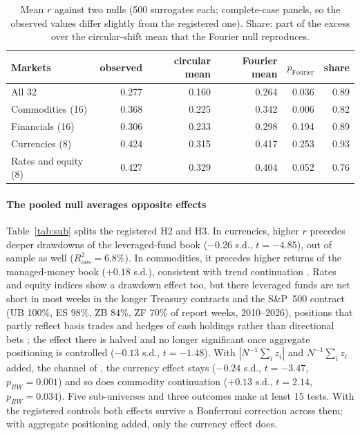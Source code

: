\documentclass[preprint,12pt,authoryear]{elsarticle}
\begin{document}
\begin{table}[t]
\centering
\caption{Mean $r$ against two nulls (500 surrogates each; complete-case
panels, so the observed values differ slightly from the registered one).
Share: part of the excess over the circular-shift mean that the
Fourier null reproduces.}
\label{tab:ft}
\small\setlength{\tabcolsep}{4pt}
\begin{tabular}{lrrrrr}
\toprule
Markets & observed & circular mean & Fourier mean & $p_{\text{Fourier}}$ & share \\
\midrule
All 32 & 0.277 & 0.160 & 0.264 & 0.036 & 0.89 \\
Commodities (16) & 0.368 & 0.225 & 0.342 & 0.006 & 0.82 \\
Financials (16) & 0.306 & 0.233 & 0.298 & 0.194 & 0.89 \\
\quad Currencies (8) & 0.424 & 0.315 & 0.417 & 0.253 & 0.93 \\
\quad Rates and equity (8) & 0.427 & 0.329 & 0.404 & 0.052 & 0.76 \\
\bottomrule
\end{tabular}
\end{table}

\paragraph{The pooled null averages opposite effects} Table~\ref{tab:sub}
splits the registered H2 and H3. In currencies, higher $r$ precedes deeper
drawdowns of the leveraged-fund book ($-0.26$ s.d., $t=-4.85$), out of sample
as well ($R^2_{oos}=6.8\%$). In commodities, it precedes higher returns of
the managed-money book ($+0.18$ s.d.), consistent with trend continuation
\citep{MoskowitzOoiPedersen2012}. Rates and equity indices show a drawdown
effect too, but there leveraged funds are net short in most weeks in the
longer Treasury contracts and the S\&P~500 contract (UB 100\%, ES 98\%, ZB
84\%, ZF 70\% of report weeks, 2010--2026), positions that partly reflect basis trades and hedges of cash
holdings rather than directional bets \citep{BarthKahn2021}; the effect there
is halved and no longer significant once aggregate positioning is controlled
($-0.13$ s.d., $t=-1.48$).
With $|N^{-1}\sum_i z_i|$ and $N^{-1}\sum_i z_i$ added, the channel of
\citet{BrunnermeierNagelPedersen2008}, the currency effect stays
($-0.24$ s.d., $t=-3.47$, $p_{RW}=0.001$) and so does commodity continuation
($+0.13$ s.d., $t=2.14$, $p_{RW}=0.034$). Five sub-universes and three
outcomes make at least 15 tests. With the registered controls both effects survive a
Bonferroni correction across them; with aggregate positioning added, only
the currency effect does.
\end{document}
